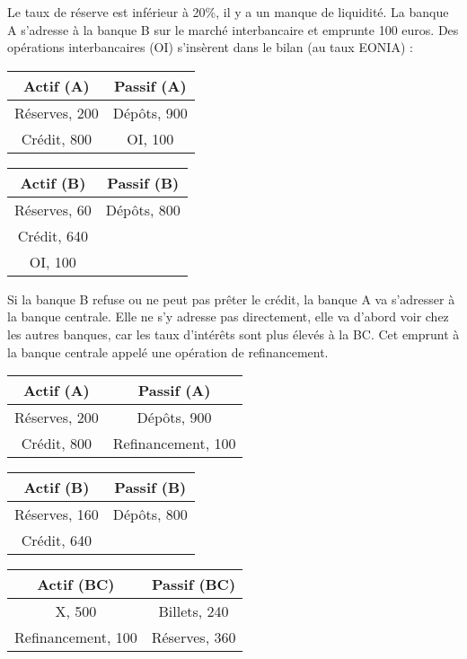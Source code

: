 	Le taux de réserve est inférieur à 20\%, il y a un manque de liquidité. La banque A s'adresse à la banque B sur le marché interbancaire et emprunte 100 euros. Des opérations interbancaires (OI) s'insèrent dans le bilan (au taux EONIA) :
	
\begin{center}
	\begin{tabular}{c|c}
	Actif (A) & Passif (A) \\ 
	\hline 
	Réserves, 200 & Dépôts, 900 \\ 
	Crédit, 800 &   OI, 100
	\end{tabular}
	
	\begin{tabular}{c|c}
	Actif (B) & Passif (B) \\ 
	\hline 
	Réserves, 60 & Dépôts, 800 \\ 
	Crédit, 640 &  \\
	OI, 100 &
	\end{tabular}
\end{center}
	
	Si la banque B refuse ou ne peut pas prêter le crédit, la banque A va s'adresser à la banque centrale. Elle ne s'y adresse pas directement, elle va d'abord voir chez les autres banques, car les taux d'intérêts sont plus élevés à la BC. Cet emprunt à la banque centrale appelé une opération de refinancement.
	
\begin{center}
	\begin{tabular}{c|c}
	Actif (A) & Passif (A) \\ 
	\hline 
	Réserves, 200 & Dépôts, 900 \\ 
	Crédit, 800 &   Refinancement, 100
	\end{tabular}
	
		
	\begin{tabular}{c|c}
	Actif (B) & Passif (B) \\ 
	\hline 
	Réserves, 160 & Dépôts, 800 \\ 
	Crédit, 640 &
	\end{tabular}
	
	
	\begin{tabular}{c|c}
	Actif (BC) & Passif (BC) \\ 
	\hline 
	X, 500 & Billets, 240 \\ 
	Refinancement, 100 & Réserves, 360 \\
	\end{tabular}
\end{center}
	
